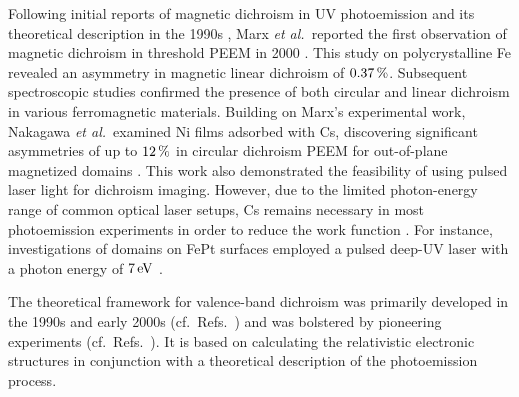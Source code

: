 \documentclass[prl,twocolumn,floatfix,superscriptaddress,aps]{revtex4-2}
\begin{document}
Following initial reports of magnetic dichroism in UV photoemission and its theoretical description in the 1990s \cite{schneider1991,henk1996,feder1996}, Marx \textit{et al.}\ reported the first observation of magnetic dichroism in threshold PEEM in 2000 \cite{marx2000}. This study on polycrystalline Fe revealed an asymmetry in magnetic linear dichroism of $\unit[0.37]{\%}$. Subsequent spectroscopic studies confirmed the presence of both circular and linear dichroism in various ferromagnetic materials. Building on Marx's experimental work, Nakagawa \textit{et al.}\ examined Ni films adsorbed with Cs, discovering significant asymmetries of up to $\unit[12]{\%}$ in circular dichroism PEEM for out-of-plane magnetized domains \cite{nakagawa2007,nakagawa2009,nakagawa2012}. This work also demonstrated the feasibility of using pulsed laser light for dichroism imaging. However, due to the limited photon-energy range of common optical laser setups, Cs remains necessary in most photoemission experiments in order to reduce the work function \cite{kronseder2011, meier2017}. For instance, investigations of domains on FePt surfaces employed a pulsed deep-UV laser with a photon energy of $\unit[7]{eV}$ \cite{zhao2019}. 

The theoretical framework for valence-band dichroism was primarily developed in the 1990s and early 2000s (cf.\ Refs.~) and was bolstered by pioneering experiments (cf.\ Refs.~). It is based on calculating the relativistic electronic  structures in conjunction with a theoretical description of the photoemission process. 
\end{document}
